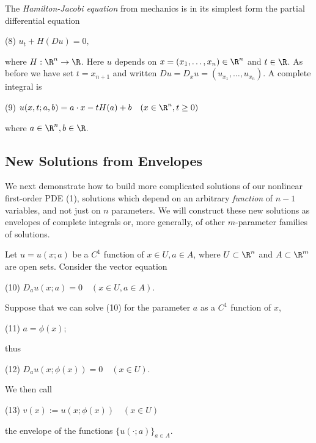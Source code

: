 \begin{example}
\label{ex:hamilton-jacobi-complete-integral}
The \textit{Hamilton-Jacobi equation} from mechanics is in its simplest form the partial differential equation

(8) $u_t + H(Du) = 0,$

where $H : \R^n \to \R$. Here $u$ depends on $x = (x_1, \ldots, x_n) \in \R^n$ and $t \in \R$. As before we have set $t = x_{n+1}$ and written $Du = D_x u = (u_{x_1}, \ldots, u_{x_n})$. A complete integral is

(9) $u(x, t; a, b) = a \cdot x - tH(a) + b \quad (x \in \R^n, t \geq 0)$

where $a \in \R^n, b \in \R$.
\end{example}

\subsection{New Solutions from Envelopes}
\label{sec:envelopes-new-solutions}

We next demonstrate how to build more complicated solutions of our nonlinear first-order PDE (1), solutions which depend on an arbitrary \textit{function} of $n - 1$ variables, and not just on $n$ parameters. We will construct these new solutions as envelopes of complete integrals or, more generally, of other $m$-parameter families of solutions.

\begin{definition}[Envelope]
\label{def:envelope}
Let $u = u(x; a)$ be a $C^1$ function of $x \in U, a \in A$, where $U \subset \R^n$ and $A \subset \R^m$ are open sets. Consider the vector equation

(10) $D_a u(x; a) = 0 \quad (x \in U, a \in A)$.

Suppose that we can solve (10) for the parameter $a$ as a $C^1$ function of $x$,

(11) $a = \phi(x);$

thus

(12) $D_a u(x; \phi(x)) = 0 \quad (x \in U)$.

We then call

(13) $v(x) := u(x; \phi(x)) \quad (x \in U)$

the envelope of the functions $\{u(\cdot; a)\}_{a \in A}$.
\end{definition}

